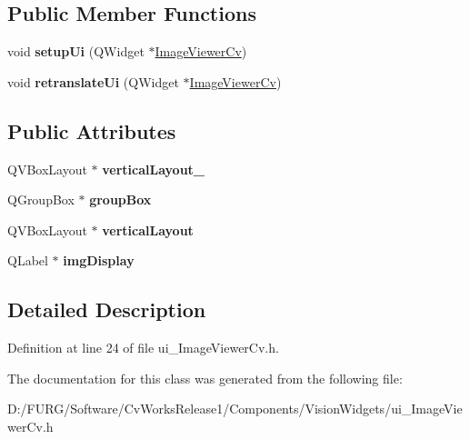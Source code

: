 \subsection*{Public Member Functions}
\begin{DoxyCompactItemize}
\item 
\hypertarget{class_ui___image_viewer_cv_a0f117f8241b1e6958e5b41d500b7f60b}{}void {\bfseries setup\+Ui} (Q\+Widget $\ast$\hyperlink{class_image_viewer_cv}{Image\+Viewer\+Cv})\label{class_ui___image_viewer_cv_a0f117f8241b1e6958e5b41d500b7f60b}

\item 
\hypertarget{class_ui___image_viewer_cv_a34ac4f3780f3186dd8871382867fe59c}{}void {\bfseries retranslate\+Ui} (Q\+Widget $\ast$\hyperlink{class_image_viewer_cv}{Image\+Viewer\+Cv})\label{class_ui___image_viewer_cv_a34ac4f3780f3186dd8871382867fe59c}

\end{DoxyCompactItemize}
\subsection*{Public Attributes}
\begin{DoxyCompactItemize}
\item 
\hypertarget{class_ui___image_viewer_cv_a1f81b7e95162efcbe551b64ca41869c8}{}Q\+V\+Box\+Layout $\ast$ {\bfseries vertical\+Layout\+\_}\label{class_ui___image_viewer_cv_a1f81b7e95162efcbe551b64ca41869c8}

\item 
\hypertarget{class_ui___image_viewer_cv_abdf6ae306987e2427f22eea513893d44}{}Q\+Group\+Box $\ast$ {\bfseries group\+Box}\label{class_ui___image_viewer_cv_abdf6ae306987e2427f22eea513893d44}

\item 
\hypertarget{class_ui___image_viewer_cv_ad85f9339d941aa92fe82db7dcba6664c}{}Q\+V\+Box\+Layout $\ast$ {\bfseries vertical\+Layout}\label{class_ui___image_viewer_cv_ad85f9339d941aa92fe82db7dcba6664c}

\item 
\hypertarget{class_ui___image_viewer_cv_ae9b932b739c25e84aa878e134f118742}{}Q\+Label $\ast$ {\bfseries img\+Display}\label{class_ui___image_viewer_cv_ae9b932b739c25e84aa878e134f118742}

\end{DoxyCompactItemize}


\subsection{Detailed Description}


Definition at line 24 of file ui\+\_\+\+Image\+Viewer\+Cv.\+h.



The documentation for this class was generated from the following file\+:\begin{DoxyCompactItemize}
\item 
D\+:/\+F\+U\+R\+G/\+Software/\+Cv\+Works\+Release1/\+Components/\+Vision\+Widgets/ui\+\_\+\+Image\+Viewer\+Cv.\+h\end{DoxyCompactItemize}
